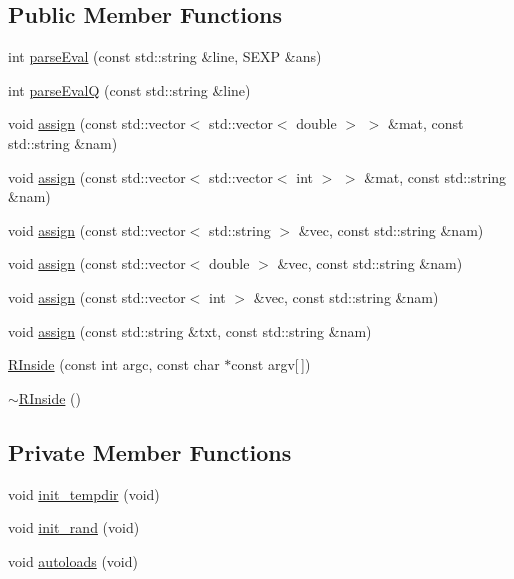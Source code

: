 \subsection*{Public Member Functions}
\begin{DoxyCompactItemize}
\item 
int \hyperlink{classRInside_a4cf10e78fb73bfda699f921c28e6b985}{parseEval} (const std::string \&line, SEXP \&ans)
\item 
int \hyperlink{classRInside_a9f18dc5011e1e32a52360b3d88f9bab7}{parseEvalQ} (const std::string \&line)
\item 
void \hyperlink{classRInside_aedd5db3eb2bcc97a93914088d599c8b4}{assign} (const std::vector$<$ std::vector$<$ double $>$ $>$ \&mat, const std::string \&nam)
\item 
void \hyperlink{classRInside_abae6700c75661cfb635859ac3d3c50d1}{assign} (const std::vector$<$ std::vector$<$ int $>$ $>$ \&mat, const std::string \&nam)
\item 
void \hyperlink{classRInside_a7c5cb94cc703541037e6acf243dc2b1b}{assign} (const std::vector$<$ std::string $>$ \&vec, const std::string \&nam)
\item 
void \hyperlink{classRInside_a9086ea21bd4a47d9411c6451c1ae50f5}{assign} (const std::vector$<$ double $>$ \&vec, const std::string \&nam)
\item 
void \hyperlink{classRInside_ab13e05865dec061ba1def1d922d2a58c}{assign} (const std::vector$<$ int $>$ \&vec, const std::string \&nam)
\item 
void \hyperlink{classRInside_a7073300c48c03478361b881e2d307ad6}{assign} (const std::string \&txt, const std::string \&nam)
\item 
\hyperlink{classRInside_aeecbfd63737539d1731b2f38852b3751}{RInside} (const int argc, const char $\ast$const argv\mbox{[}$\,$\mbox{]})
\item 
\hyperlink{classRInside_a277fc333d12163eaea9b903711586146}{$\sim$RInside} ()
\end{DoxyCompactItemize}
\subsection*{Private Member Functions}
\begin{DoxyCompactItemize}
\item 
void \hyperlink{classRInside_ae045f7e3d8b0881e2af8cdfb5c5fc118}{init\_\-tempdir} (void)
\item 
void \hyperlink{classRInside_af9920dd157552b7a5dce8573574ce78d}{init\_\-rand} (void)
\item 
void \hyperlink{classRInside_a41c250f2ef249a02a0d32e761628d943}{autoloads} (void)
\end{DoxyCompactItemize}
